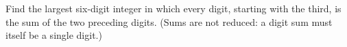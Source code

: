 Find the largest six-digit integer in which every digit, starting with the third, is the sum of the two preceding digits. (Sums are not reduced: a digit sum must itself be a single digit.)
